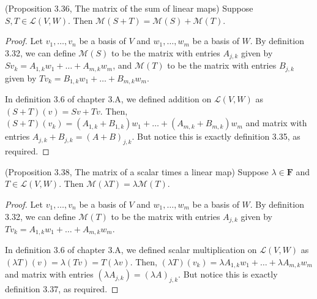 \begin{exercise}{7}
 (Proposition 3.36, The matrix of the sum of linear maps) Suppose $S,T\in\mathcal{L}(V,W)$. Then $\mathcal{M}(S+T) = \mathcal{M}(S) + \mathcal{M}(T)$.
\end{exercise}
\begin{proof}
 Let $v_{1},\dots,v_{n}$ be a basis of $V$ and $w_{1},\dots,w_{m}$ be a basis of $W$. By definition 3.32, we can define $\mathcal{M}(S)$ to be the matrix with entries $A_{j,k}$ given by $Sv_{k}=A_{1,k}w_{1}+\dots+A_{m,k}w_{m}$, and $\mathcal{M}(T)$ to be the matrix with entries $B_{j,k}$ given by $Tv_{k}=B_{1,k}w_{1}+\dots+B_{m,k}w_{m}$. 
 
 In definition 3.6 of chapter 3.A, we defined addition on $\mathcal{L}(V,W)$ as $(S+T)(v)=Sv+Tv$. Then, $(S+T)(v_{k}) = (A_{1,k}+B_{1,k})w_{1} + \dots + (A_{m,k}+B_{m,k})w_{m}$ and matrix with entries $A_{j,k}+B_{j,k}=(A+B)_{j,k}$. But notice this is exactly definition 3.35, as required.
\end{proof}


\begin{exercise}{8}
 (Proposition 3.38, The matrix of a scalar times a linear map) Suppose $\lambda\in\mathbf{F}$ and $T\in\mathcal{L}(V,W)$. Then $\mathcal{M}(\lambda T) = \lambda\mathcal{M}(T)$.
\end{exercise}
\begin{proof}
 Let $v_{1},\dots,v_{n}$ be a basis of $V$ and $w_{1},\dots,w_{m}$ be a basis of $W$. By definition 3.32, we can define $\mathcal{M}(T)$ to be the matrix with entries $A_{j,k}$ given by $Tv_{k}=A_{1,k}w_{1}+\dots+A_{m,k}w_{m}$. 
 
 In definition 3.6 of chapter 3.A, we defined scalar multiplication on $\mathcal{L}(V,W)$ as $(\lambda T)(v)=\lambda(Tv)=T(\lambda v)$. Then, $(\lambda T)(v_{k}) = \lambda A_{1,k}w_{1} + \dots + \lambda A_{m,k}w_{m}$ and matrix with entries $(\lambda A_{j,k})=(\lambda A)_{j,k}$. But notice this is exactly definition 3.37, as required.
\end{proof}


